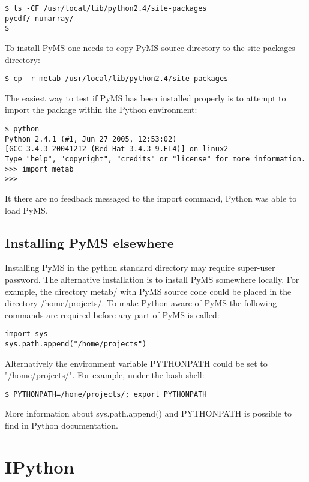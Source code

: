 \begin{verbatim}
$ ls -CF /usr/local/lib/python2.4/site-packages
pycdf/ numarray/
$ 
\end{verbatim}

To install PyMS one needs to copy PyMS source directory to
the site-packages directory:

\begin{verbatim}
$ cp -r metab /usr/local/lib/python2.4/site-packages
\end{verbatim}

The easiest way to test if PyMS has been installed properly is 
to attempt to import the package within the Python environment:

\begin{verbatim}
$ python
Python 2.4.1 (#1, Jun 27 2005, 12:53:02) 
[GCC 3.4.3 20041212 (Red Hat 3.4.3-9.EL4)] on linux2
Type "help", "copyright", "credits" or "license" for more information.
>>> import metab
>>>
\end{verbatim}

It there are no feedback messaged to the import command, Python
was able to load PyMS. 

\subsection{Installing PyMS elsewhere}

Installing PyMS in the python standard directory may require
super-user password. The alternative installation is to install
PyMS somewhere locally. For example, the directory metab/ with
PyMS source code could be placed in the directory /home/projects/.
To make Python aware of PyMS the following commands are required
before any part of PyMS is called:

\begin{verbatim}
import sys
sys.path.append("/home/projects")
\end{verbatim}

Alternatively the environment variable PYTHONPATH could be set
to "/home/projects/". For example, under the bash shell: 

\begin{verbatim}
$ PYTHONPATH=/home/projects/; export PYTHONPATH
\end{verbatim}

More information about sys.path.append() and PYTHONPATH is possible
to find in Python documentation.

\section{IPython}

